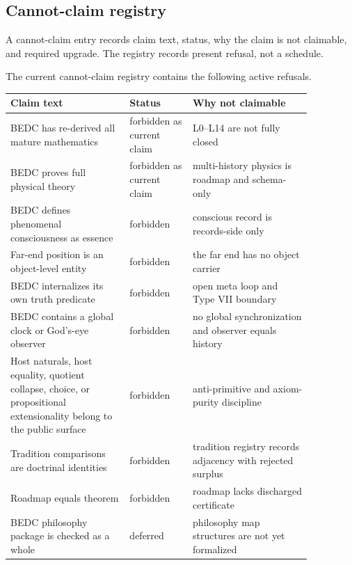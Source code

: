 \subsection{Cannot-claim registry}
\label{subsec:philosophy-cannot-claim-registry-table}

\begin{definition}
\label{def:philosophy-cannot-claim-registry-entry}
A cannot-claim entry records claim text, status, why the claim is not
claimable, and required upgrade. The registry records present refusal,
not a schedule.
\end{definition}

\begin{definition}
\label{def:philosophy-current-cannot-claim-registry}
The current cannot-claim registry contains the following active
refusals.

\begin{center}
\begin{tabular}{p{0.34\linewidth}p{0.18\linewidth}p{0.34\linewidth}}
\textbf{Claim text} & \textbf{Status} & \textbf{Why not claimable} \\
\hline
BEDC has re-derived all mature mathematics & forbidden as current claim & L0--L14 are not fully closed \\
BEDC proves full physical theory & forbidden as current claim & multi-history physics is roadmap and schema-only \\
BEDC defines phenomenal consciousness as essence & forbidden & conscious record is records-side only \\
Far-end position is an object-level entity & forbidden & the far end has no object carrier \\
BEDC internalizes its own truth predicate & forbidden & open meta loop and Type VII boundary \\
BEDC contains a global clock or God's-eye observer & forbidden & no global synchronization and observer equals history \\
Host naturals, host equality, quotient collapse, choice, or propositional extensionality belong to the public surface & forbidden & anti-primitive and axiom-purity discipline \\
Tradition comparisons are doctrinal identities & forbidden & tradition registry records adjacency with rejected surplus \\
Roadmap equals theorem & forbidden & roadmap lacks discharged certificate \\
BEDC philosophy package is checked as a whole & deferred & philosophy map structures are not yet formalized \\
\end{tabular}
\end{center}
\end{definition}

